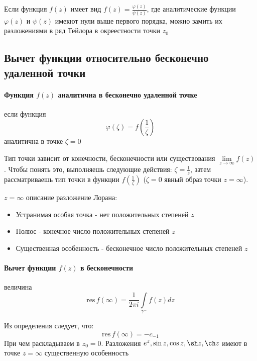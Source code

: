 \documentclass[12pt]{extarticle}
\newcommand{\res}{\mathrm{res}\,}
\begin{document}
Если функция $f(z)$ имеет вид $f(z)=\frac{\varphi(z)}{\psi(z)}$, где
аналитические функции $\varphi(z)$ и $\psi(z)$ имекют нули выше первого
порядка, можно замить их разложениями в ряд Тейлора в окреестности точки
$z_{0}$

\subsection{Вычет функции относительно бесконечно удаленной точки}
\paragraph{Функция $f(z)$ аналитична в бесконечно удаленной точке}
если функция
\begin{displaymath}
    \varphi(\zeta)=f\left(\frac{1}{\zeta}\right)
\end{displaymath}
аналитична в точке $\zeta=0$
\par Тип точки зависит от конечности, бесконечности или существования
$\lim\limits_{z\rightarrow \infty}f(z)$. Чтобы понять это, выполняешь
следующие действия: $\zeta=\frac{1}{z}$, затем рассматриваешь тип точки
в функции $f\left(\frac{1}{\zeta}\right)$ ($\zeta=0$ явный образ точки
$z=\infty$).

\par $z=\infty$ описание разложение Лорана:
\begin{itemize}
    \itemsep0em
    \item Устранимая особая точка - нет положительных степеней $z$
    \item Полюс - конечное число положительных степеней $z$
    \item Существенная особенность - бесконечное число положительных
        степеней $z$
\end{itemize}

\paragraph{Вычет функции $f(z)$ в бесконечности}
величина
\begin{displaymath}
    \res f(\infty)=\frac{1}{2\pi i}\int\limits_{\gamma^{-}}f(z)dz
\end{displaymath}

Из определения следует, что:
\begin{displaymath}
    \res f(\infty)=-c_{-1}
\end{displaymath}
При чем раскладываем в $z_{0}=0$. Разложения $e^{z},\sin z,\cos z,\sh z,\ch z$
имеют в точке $z=\infty$ существенную особенность
\end{document}
